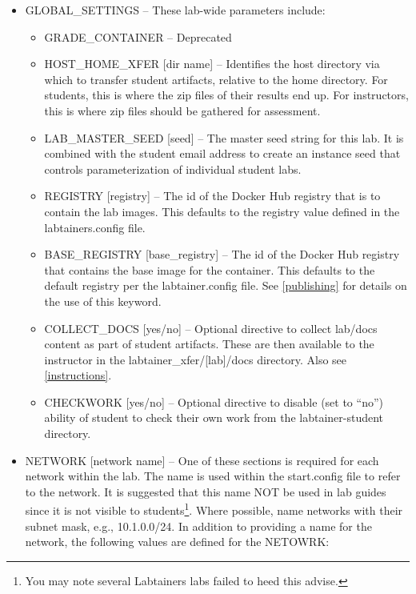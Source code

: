 \documentclass[12pt]{article}
\begin{document}
\begin{itemize}
\item GLOBAL\_SETTINGS -- These lab-wide parameters include:

\begin{itemize}
\item GRADE\_CONTAINER -- Deprecated
\item HOST\_HOME\_XFER [dir name] --  Identifies the host directory via which to transfer student artifacts, relative to 
the home directory.  For students, this is where the zip files of their results end up.  For instructors, this is
where zip files should be gathered for assessment.
\item LAB\_MASTER\_SEED [seed] -- The master seed string for this lab.  It is combined with the student email
address to create an instance seed that controls parameterization of individual student labs.
\item REGISTRY [registry] -- The id of the Docker Hub registry that is to contain the lab images. This defaults to the
registry value defined in the labtainers.config file.
\item BASE\_REGISTRY [base\_registry] -- The id of the Docker Hub registry that contains the base image for the container.  This defaults
to the default registry per the labtainer.config file.
See \ref{publishing} for details on the use of this keyword.
\item COLLECT\_DOCS [yes/no] -- Optional directive to collect lab/docs content as part of student artifacts.
These are then available to the instructor in the labtainer\_xfer/[lab]/docs directory.  Also see \ref{instructions}.
\item CHECKWORK [yes/no] -- Optional directive to disable (set to ``no'') ability of student to check their own work from the labtainer-student directory.
\end{itemize}

\item NETWORK [network name] -- One of these sections is required for each network within the lab.  The name
is used within the start.config file to refer to the network.  It is suggested that this name NOT be
used in lab guides since it is not visible to students\footnote{You may note several Labtainers labs
failed to heed this advise.}. Where possible, name networks with their subnet mask, e.g., 10.1.0.0/24.
In addition to providing a name for the network, the following values are defined for the NETOWRK:


\end{itemize}
\end{document}
